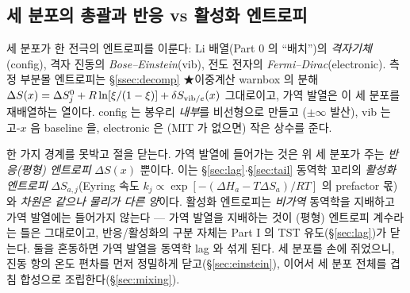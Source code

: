 \subsection{세 분포의 총괄과 반응 vs 활성화 엔트로피}\label{ssec:threedist}
\begin{keybox}
세 분포가 한 전극의 엔트로피를 이룬다: Li 배열(Part 0 의 ``배치'')의 \emph{격자기체}(config), 격자 진동의
\emph{Bose--Einstein}(vib), 전도 전자의 \emph{Fermi--Dirac}(electronic). 측정 부분몰 엔트로피는
\S\ref{ssec:decomp} ★이중계산 warnbox 의 분해 $\Delta S(x)=\Delta S^0_j+R\ln[\xi/(1-\xi)]+\delta S_{\mathrm{vib}/e}(x)$
그대로이고, 가역 발열은 이 세 분포를 재배열하는 열이다. config 는 봉우리 \emph{내부}를 비선형으로 만들고
($\pm\infty$ 발산), vib 는 고-$x$ 음 baseline 을, electronic 은 (MIT 가 없으면) 작은 상수를 준다.
\end{keybox}

한 가지 경계를 못박고 절을 닫는다. 가역 발열에 들어가는 것은 위 세 분포가 주는 \emph{반응(평형) 엔트로피}
$\Delta S(x)$ 뿐이다. 이는 \S\ref{sec:lag}$\cdot$\S\ref{sec:tail} 동역학 꼬리의 \emph{활성화 엔트로피} $\Delta S_{a,j}$(Eyring
속도 $k_j\propto\exp[-(\Delta H_a-T\Delta S_a)/RT]$ 의 prefactor 몫)와 \emph{차원은 같으나 물리가 다른
양}이다. 활성화 엔트로피는 \emph{비가역} 동역학을 지배하고 가역 발열에는 들어가지 않는다 --- 가역 발열을
지배하는 것이 (평형) 엔트로피 계수라는 틀은 \cite{msmr_partI} 그대로이고, 반응/활성화의 구분 자체는
Part I 의 TST 유도(\S\ref{sec:lag})가 닫는다. 둘을 혼동하면 가역 발열을 동역학 lag 와 섞게 된다. 세 분포를 손에 쥐었으니, 진동 항의 온도 편차를 먼저
정밀하게 닫고(\S\ref{sec:einstein}), 이어서 세 분포 전체를 겹침 합성으로 조립한다(\S\ref{sec:mixing}).

